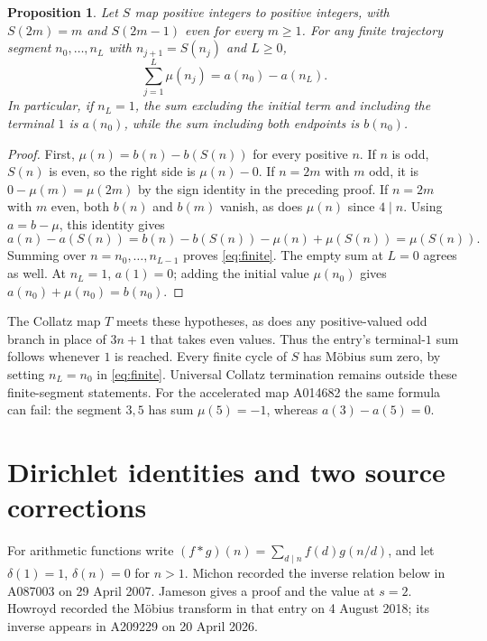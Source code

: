 \documentclass[11pt]{article}
\newtheorem{proposition}[theorem]{Proposition}
\begin{document}
\begin{proposition}\label{prop:trajectory}
Let $S$ map positive integers to positive integers, with
$S(2m)=m$ and $S(2m-1)$ even for every $m\geq1$.
For any finite trajectory segment $n_0,\ldots,n_L$ with
$n_{j+1}=S(n_j)$ and $L\geq0$,
\begin{equation}\label{eq:finite}
 \sum_{j=1}^{L}\mu(n_j)=a(n_0)-a(n_L).
\end{equation}
In particular, if $n_L=1$, the sum excluding the initial term and
including the terminal $1$ is $a(n_0)$, while the sum including both
endpoints is $b(n_0)$.
\end{proposition}
\begin{proof}
First, $\mu(n)=b(n)-b(S(n))$ for every positive $n$. If $n$ is odd,
$S(n)$ is even, so the right side is $\mu(n)-0$. If $n=2m$ with
$m$ odd, it is $0-\mu(m)=\mu(2m)$ by the sign identity in the preceding
proof. If $n=2m$ with $m$ even, both $b(n)$ and $b(m)$ vanish, as does
$\mu(n)$ since $4\mid n$.
Using $a=b-\mu$, this identity gives
\[
 a(n)-a(S(n))
 =b(n)-b(S(n))-\mu(n)+\mu(S(n))=\mu(S(n)).
\]
Summing over $n=n_0,\ldots,n_{L-1}$ proves \eqref{eq:finite}.
The empty sum at $L=0$ agrees as well. At $n_L=1$, $a(1)=0$;
adding the initial value $\mu(n_0)$ gives $a(n_0)+\mu(n_0)=b(n_0)$.
\end{proof}
The Collatz map $T$ meets these hypotheses, as does any positive-valued
odd branch in place of $3n+1$ that takes even values. Thus the entry's
terminal-$1$ sum follows whenever $1$ is reached. Every finite cycle
of $S$ has M\"obius sum zero, by setting $n_L=n_0$ in
\eqref{eq:finite}. Universal Collatz termination remains outside these
finite-segment statements. For the accelerated map A014682 the same
formula can fail: the segment $3,5$ has sum $\mu(5)=-1$, whereas
$a(3)-a(5)=0$.

\section{Dirichlet identities and two source corrections}
For arithmetic functions write $(f*g)(n)=\sum_{d\mid n}f(d)g(n/d)$,
and let $\delta(1)=1$, $\delta(n)=0$ for $n>1$.
Michon recorded the inverse relation below in A087003 on
29 April 2007. Jameson \cite[Lemma 2]{jameson} gives a proof and the
value at $s=2$. Howroyd recorded the M\"obius transform in that entry
on 4 August 2018; its inverse appears in A209229 on 20 April 2026.
\end{document}
